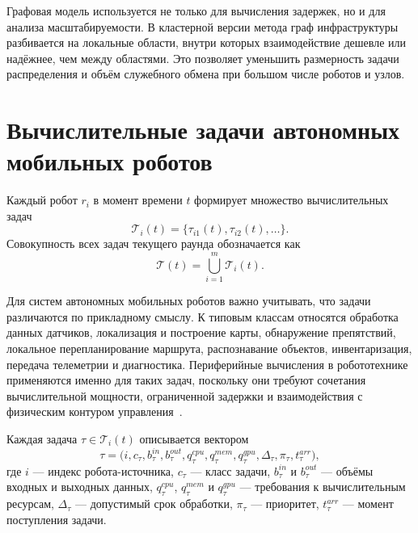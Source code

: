 Графовая модель используется не только для вычисления задержек, но и для анализа масштабируемости. В кластерной версии метода граф инфраструктуры разбивается на локальные области, внутри которых взаимодействие дешевле или надёжнее, чем между областями. Это позволяет уменьшить размерность задачи распределения и объём служебного обмена при большом числе роботов и узлов.

\section{Вычислительные задачи автономных мобильных роботов}

Каждый робот $r_i$ в момент времени $t$ формирует множество вычислительных задач
\begin{equation}
    \mathcal{T}_i(t)=\{\tau_{i1}(t),\tau_{i2}(t),\ldots\}.
    \label{eq:ch2_robot_tasks}
\end{equation}
Совокупность всех задач текущего раунда обозначается как
\begin{equation}
    \mathcal{T}(t)=\bigcup_{i=1}^{m}\mathcal{T}_i(t).
    \label{eq:ch2_all_tasks}
\end{equation}

Для систем автономных мобильных роботов важно учитывать, что задачи различаются по прикладному смыслу. К типовым классам относятся обработка данных датчиков, локализация и построение карты, обнаружение препятствий, локальное перепланирование маршрута, распознавание объектов, инвентаризация, передача телеметрии и диагностика. Периферийные вычисления в робототехнике применяются именно для таких задач, поскольку они требуют сочетания вычислительной мощности, ограниченной задержки и взаимодействия с физическим контуром управления~\cite{Tahir2025EdgeRoboticsSurvey,Chaari2022RobotOffloadingSurvey}.

Каждая задача $\tau\in\mathcal{T}_i(t)$ описывается вектором
\begin{equation}
    \tau=\bigl(i, c_{\tau}, b^{in}_{\tau}, b^{out}_{\tau}, q^{cpu}_{\tau}, q^{mem}_{\tau}, q^{gpu}_{\tau}, \Delta_{\tau}, \pi_{\tau}, t^{arr}_{\tau}\bigr),
    \label{eq:ch2_task_vector}
\end{equation}
где $i$ --- индекс робота-источника, $c_{\tau}$ --- класс задачи, $b^{in}_{\tau}$ и $b^{out}_{\tau}$ --- объёмы входных и выходных данных, $q^{cpu}_{\tau}$, $q^{mem}_{\tau}$ и $q^{gpu}_{\tau}$ --- требования к вычислительным ресурсам, $\Delta_{\tau}$ --- допустимый срок обработки, $\pi_{\tau}$ --- приоритет, $t^{arr}_{\tau}$ --- момент поступления задачи.


